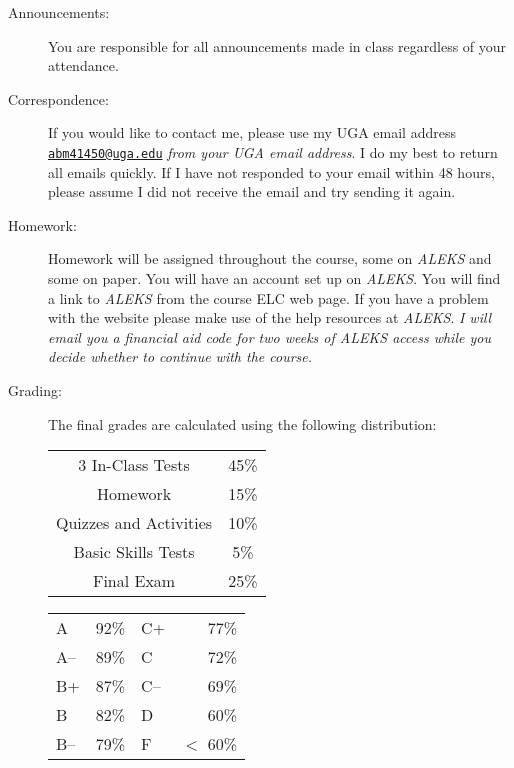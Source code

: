\documentclass[letterpaper,11pt]{article}
\begin{document}
\begin{description}
\item[Announcements:] You are responsible for all announcements made in
  class regardless of your attendance.

\item[Correspondence:] If you would like to contact me, please use my
  UGA email address \href{mailto:abm41450@uga.edu}{\texttt{abm41450@uga.edu}} \emph{from your UGA email
  address}. I do my best to return all emails quickly. If
  I have not responded to your email within 48 hours, please assume I
  did not receive the email and try sending it again.

\item[Homework:] Homework will be assigned throughout the course, some on \emph{ALEKS} and some on paper. You will have an account set up on \emph{ALEKS}. You will find a link to \emph{ALEKS}
from the course ELC web page. If you have a problem with
the website please make use of the help resources at \emph{ALEKS}. \emph{I will email you a financial aid code for two weeks of ALEKS access while you decide whether to continue with the course.}

\item[Grading:] %
  
  The final grades are calculated using the following distribution:
\begin{multicols}{2}
  \begin{center}
  \begin{tabular}{c  c}
    3 In-Class Tests & 45\% \\
    Homework & 15\% \\
    Quizzes and Activities  & 10\% \\
    Basic Skills Tests & 5\% \\
    Final Exam & 25\%
  \end{tabular}
  \end{center}
  \columnbreak
  \begin{center}
    \begin{tabular}{|l r | l r|}
      \hline
      A & 92\% & C+ & 77\% \\
      A-- & 89\%&  C & 72\% \\
      B+ & 87\% & C-- & 69\% \\
      B & 82\% & D & 60\% \\
      B-- & 79\% & F & $<$ 60\%\\
      \hline
    \end{tabular}
  \end{center}
\end{multicols}


\end{description}
\end{document}
